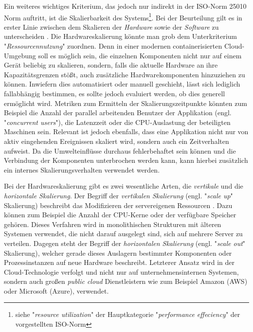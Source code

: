 Ein weiteres wichtiges Kriterium, das jedoch nur indirekt in der ISO-Norm 25010 Norm auftritt, ist die Skalierbarkeit des Systems\footnote{siehe "\emph{resource utilization}" der Hauptkategorie "\emph{performance effeciency}" der vorgestellten ISO-Norm}. Bei der Beurteilung gilt es in erster Linie zwischen dem Skalieren der \emph{Hardware} sowie der \emph{Software} zu unterscheiden \cite{nfr-dotnetcurry}. Die Hardwareskalierung könnte man grob dem Unterkriterium "\emph{Ressourcennutzung}" zuordnen. Denn in einer modernen containerisierten Cloud-Umgebung soll es möglich sein, die einzelnen Komponenten nicht nur auf einem Gerät beliebig zu skalieren, sondern, falls die aktuelle Hardware an ihre Kapazitätsgrenzen stößt, auch zusätzliche Hardwarekomponenten hinzuziehen zu können. Inwiefern dies automatisiert oder manuell geschieht, lässt sich lediglich fallabhängig bestimmen, es sollte jedoch evaluiert werden, ob dies generell ermöglicht wird. Metriken zum Ermitteln der Skalierungszeitpunkte könnten zum Beispiel die Anzahl der parallel arbeitenden Benutzer der Applikation (engl. "\emph{concurrent users}"), die Latenzzeit oder die CPU-Auslastung der beteiligten Maschinen sein. Relevant ist jedoch ebenfalls, dass eine Applikation nicht nur von aktiv eingehenden Ereignissen skaliert wird, sondern auch ein Zeitverhalten aufweist. Da die Umwelteinflüsse durchaus fehlerbehaftet sein können und die Verbindung der Komponenten unterbrochen werden kann, kann hierbei zusätzlich ein internes Skalierungsverhalten verwendet werden.

Bei der Hardwareskalierung gibt es zwei wesentliche Arten, die \emph{vertikale} und die \emph{horizontale Skalierung}. Der Begriff der \emph{vertikalen Skalierung} (engl. "\emph{scale up}" Skalierung) beschreibt das Modifizieren der servereigenen Ressourcen \cite[Absatz \emph{Scalability}]{nfr-dotnetcurry}. Dazu können zum Beispiel die Anzahl der CPU-Kerne oder der verfügbare Speicher gehören. Dieses Verfahren wird in monolithischen Strukturen mit älteren Systemen verwendet, die nicht darauf ausgelegt sind, sich auf mehrere Server zu verteilen. Dagegen steht der Begriff der \emph{horizontalen Skalierung} (engl. "\emph{scale out}" Skalierung), welcher gerade dieses Auslagern bestimmter Komponenten oder Prozessinstanzen auf neue Hardware beschreibt. Letzterer Ansatz wird in der Cloud-Technologie verfolgt und nicht nur auf unternehmensinternen Systemen, sondern auch großen \emph{public cloud} Dienstleistern wie zum Beispiel Amazon (AWS) oder Microsoft (Azure), verwendet.

